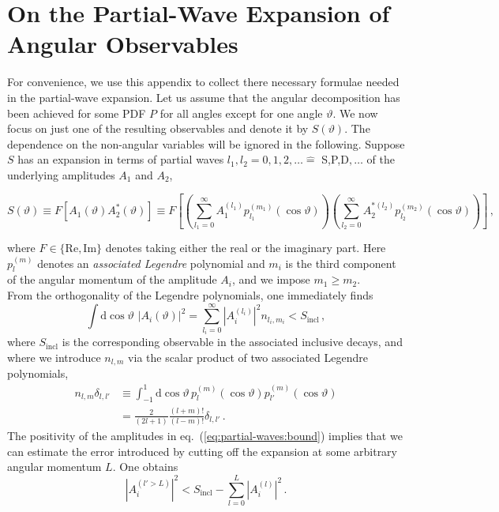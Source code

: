 \documentclass[aps,nofootinbib,preprintnumbers,prd,twocolumn]{revtex4-1}
\newcommand{\refeq}[1]{eq.~(\ref{eq:#1})}
\newcommand{\rmdx}[1]{\mbox{d} #1 \,} %
\renewcommand{\theta}{\vartheta}
\begin{document}
\section{On the Partial-Wave Expansion of Angular Observables}
\label{app:partial-waves}

For convenience, we use this appendix to collect there necessary
formulae needed in the partial-wave expansion.
Let us assume that the angular decomposition has been achieved for
some PDF $P$ for all angles except for one angle $\theta$. We now
focus on just one of the resulting observables and denote it by
$S(\theta)$. The dependence on the non-angular variables will be
ignored in the following. Suppose $S$
has an expansion in terms of partial waves $l_1, l_2 = 0,1,2,\dots
\hat{=}$ S,P,D$,\dots$ of the underlying amplitudes $A_1$ and $A_2$,
\begin{widetext}
\begin{equation}
    \label{eq:def-partial-wave-observable}
    S(\theta) \equiv F\left[A_1(\theta) A_2^*(\theta)\right] \equiv F\left[\left(\sum_{l_1=0}^\infty A_1^{(l_1)} p_{l_1}^{(m_1)}(\cos\theta)\right) \left(\sum_{l_2=0}^\infty A_2^{*(l_2)} p_{l_2}^{(m_2)}(\cos\theta)\right)\right]\,,
\end{equation}
\end{widetext}
where $F \in \{\text{Re},\text{Im}\}$ denotes taking either the real
or the imaginary part. Here $p_{l}^{(m)}$ denotes an \emph{associated Legendre} polynomial and $m_i$ is the third component of the angular momentum of the amplitude $A_i$, and we impose $m_1 \geq m_2$.\\

From the orthogonality of the Legendre polynomials, one immediately finds
\begin{equation}
    \label{eq:partial-waves:bound}
    \int \rmdx{\cos\theta}  \, |A_i(\theta)|^2 = \sum_{l_i = 0}^\infty |A_i^{(l_i)}|^2 n_{l_i, m_i} < S_\text{incl}\,,
\end{equation}
where $S_\text{incl}$ is the corresponding observable in the associated inclusive decays,
and where we introduce $n_{l,m}$ via the scalar product of two associated Legendre polynomials,
\begin{equation}
\label{eq:legendre-scalar-product}
\begin{aligned}
    n_{l, m} \delta_{l, l'}
    & \equiv \int_{-1}^1 \rmdx{\cos\theta} p_{l}^{(m)}(\cos\theta) p_{l'}^{(m)} (\cos\theta)\\
    & = \frac{2}{(2 l + 1)} \frac{(l + m)!}{(l - m)!} \delta_{l, l'}\,.
\end{aligned}
\end{equation}
The positivity of the amplitudes in \refeq{partial-waves:bound} implies that we can estimate
the error introduced by cutting off the expansion at some arbitrary angular momentum $L$. One
obtains
\begin{equation}
    |A_i^{(l' > L)}|^2 < S_\text{incl} - \sum_{l=0}^L |A_i^{(l)}|^2\,.
\end{equation}
\end{document}
